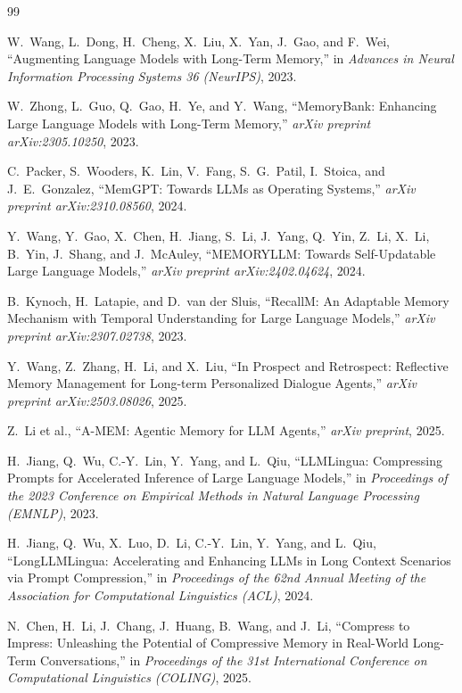 \documentclass[conference]{IEEEtran}
\begin{document}
\begin{thebibliography}{99}

W.~Wang, L.~Dong, H.~Cheng, X.~Liu, X.~Yan, J.~Gao, and F.~Wei,
``Augmenting Language Models with Long-Term Memory,''
in \emph{Advances in Neural Information Processing Systems 36 (NeurIPS)}, 2023.

W.~Zhong, L.~Guo, Q.~Gao, H.~Ye, and Y.~Wang,
``MemoryBank: Enhancing Large Language Models with Long-Term Memory,''
\emph{arXiv preprint arXiv:2305.10250}, 2023.

C.~Packer, S.~Wooders, K.~Lin, V.~Fang, S.~G.~Patil, I.~Stoica, and J.~E.~Gonzalez,
``MemGPT: Towards LLMs as Operating Systems,''
\emph{arXiv preprint arXiv:2310.08560}, 2024.

Y.~Wang, Y.~Gao, X.~Chen, H.~Jiang, S.~Li, J.~Yang, Q.~Yin, Z.~Li, X.~Li, B.~Yin, J.~Shang, and J.~McAuley,
``MEMORYLLM: Towards Self-Updatable Large Language Models,''
\emph{arXiv preprint arXiv:2402.04624}, 2024.

B.~Kynoch, H.~Latapie, and D.~van der Sluis,
``RecallM: An Adaptable Memory Mechanism with Temporal Understanding for Large Language Models,''
\emph{arXiv preprint arXiv:2307.02738}, 2023.

Y.~Wang, Z.~Zhang, H.~Li, and X.~Liu,
``In Prospect and Retrospect: Reflective Memory Management for Long-term Personalized Dialogue Agents,''
\emph{arXiv preprint arXiv:2503.08026}, 2025.

Z.~Li et al.,
``A-MEM: Agentic Memory for LLM Agents,''
\emph{arXiv preprint}, 2025.

H.~Jiang, Q.~Wu, C.-Y.~Lin, Y.~Yang, and L.~Qiu,
``LLMLingua: Compressing Prompts for Accelerated Inference of Large Language Models,''
in \emph{Proceedings of the 2023 Conference on Empirical Methods in Natural Language Processing (EMNLP)}, 2023.

H.~Jiang, Q.~Wu, X.~Luo, D.~Li, C.-Y.~Lin, Y.~Yang, and L.~Qiu,
``LongLLMLingua: Accelerating and Enhancing LLMs in Long Context Scenarios via Prompt Compression,''
in \emph{Proceedings of the 62nd Annual Meeting of the Association for Computational Linguistics (ACL)}, 2024.

N.~Chen, H.~Li, J.~Chang, J.~Huang, B.~Wang, and J.~Li,
``Compress to Impress: Unleashing the Potential of Compressive Memory in Real-World Long-Term Conversations,''
in \emph{Proceedings of the 31st International Conference on Computational Linguistics (COLING)}, 2025.


\end{thebibliography}
\end{document}
